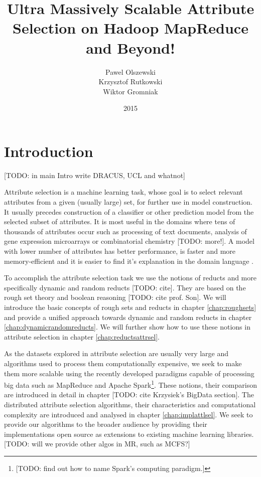 \documentclass[12pt]{report}
\title{Ultra Massively Scalable Attribute Selection on Hadoop MapReduce and Beyond!}
\author{Pawel Olszewski\\
        Krzysztof Rutkowski\\
        Wiktor Gromniak}
\date{2015}
\begin{document}
\maketitle
\tableofcontents

\chapter{Introduction}

[TODO: in main Intro write DRACUS, UCL and whatnot]

Attribute selection is a machine learning task, whose goal is to select relevant attributes from a given (usually large) set, for further use in model construction. It usually precedes construction of a classifier or other prediction model from the selected subset of attributes. It is most useful in the domains where tens of thousands of attributes occur such as processing of text documents, analysis of gene expression microarrays or combinatorial chemistry \cite{guyon} [TODO: more!]. A model with lower number of attributes has better performance, is faster and more memory-efficient and it is easier to find it's explanation in the domain language \cite{guyon}.

To accomplish the attribute selection task we use the notions of reducts and more specifically dynamic and random reducts [TODO: cite]. They are based on the rough set theory and boolean reasoning [TODO: cite prof. Son]. We will introduce the basic concepts of rough sets and reducts in chapter \ref{chap:roughsets} and provide a unified approach towards dynamic and random reducts in chapter \ref{chap:dynamicrandomreducts}. We will further show how to use these notions in attribute selection in chapter \ref{chap:reductsattrsel}.

As the datasets explored in attribute selection are usually very large and algorithms used to process them computationally expensive, we seek to make them more scalable using the recently developed paradigms capable of processing big data such as MapReduce and Apache Spark\footnote{[TODO: find out how to name Spark's computing paradigm.]}. These notions, their comparison are introduced in detail in chapter [TODO: cite Krzysiek's BigData section]. The distributed attribute selection algorithms, their characteristics and computational complexity are introduced and analysed in chapter \ref{chap:implattlsel}. We seek to provide our algorithms to the broader audience by providing their implementations open source as extensions to existing machine learning libraries. [TODO: will we provide other algos in MR, such as MCFS?]
\end{document}
